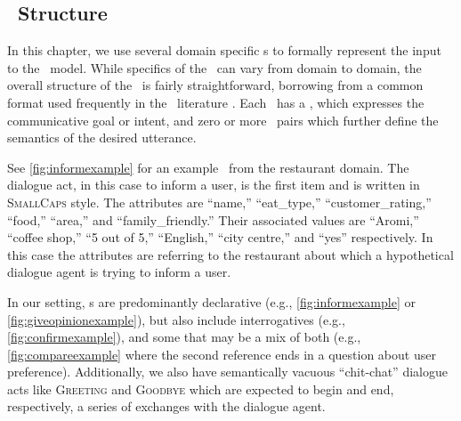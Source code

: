 \subsection{\MeaningRepresentation~Structure}

In this chapter, we use several domain specific \meaningrepresentation s to
formally represent the input to the \surfacerealization~model.  While
specifics of the \meaningrepresentation~can vary from domain to domain, the
overall structure of the \meaningrepresentation~is fairly straightforward,
borrowing from a common format used frequently in the
\naturallanguagegeneration~literature
\citep{mairesse2010,gasic2014,wen2015,novikova2017,juraska2019}. Each
\meaningrepresentation~has a \dialogueact, which
expresses the communicative goal or intent, and zero or more
\attributevalue~pairs which further define the semantics of the desired
utterance. 

See \autoref{fig:informexample} for an example \meaningrepresentation~from
the restaurant domain. The dialogue act, in this case to inform a user,
is the first item and is written in \textsc{SmallCaps} style.
The attributes are ``name,'' ``eat\_type,'' ``customer\_rating,'' ``food,'' 
``area,'' and ``family\_friendly.''
Their associated values are ``Aromi,'' ``coffee shop,'' ``5 out of 5,'' 
``English,'' ``city centre,'' and ``yes'' respectively. In this
case the attributes are referring to the restaurant about which a hypothetical
dialogue agent is trying to inform a user.

In our setting, \dialogueact s are predominantly declarative (e.g.,
\autoref{fig:informexample} or \autoref{fig:giveopinionexample}), but also
include interrogatives  (e.g., \autoref{fig:confirmexample}), and some that may be
a mix of both (e.g., \autoref{fig:compareexample} where the second reference
ends in a question about user preference).  Additionally, we also have
semantically vacuous ``chit-chat'' dialogue acts like \textsc{Greeting} and 
\textsc{Goodbye} which are expected to begin and end, respectively, 
a series of exchanges with the dialogue agent. 




